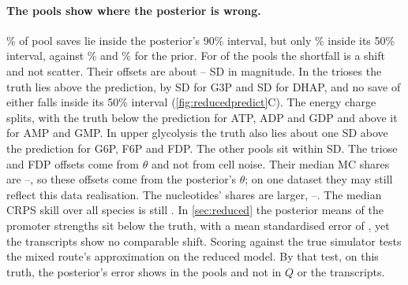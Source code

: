 \paragraph{The pools show where the posterior is wrong.} \% of pool saves
lie inside the posterior's 90\% interval, but only \% inside its 50\%
interval, against \% and \% for the prior. For
 of the  pools the shortfall is a shift and not scatter. Their offsets are
about -- SD in magnitude. In the trioses the truth lies above
the prediction, by  SD for G3P and  SD for DHAP, and no save of
either falls inside its 50\% interval (\cref{fig:reducedpredict}C). The energy charge splits,
with the truth below the prediction for ATP, ADP and GDP and above it for AMP and GMP. In upper
glycolysis the truth also lies about one SD above the prediction for G6P, F6P and FDP. The other 
pools sit within  SD. The triose and FDP offsets come from $\theta$ and not from cell
noise. Their median MC shares are --, so these offsets
come from the posterior's $\theta$; on one dataset they may still reflect this data realisation. The nucleotides' shares are larger, --. The median CRPS skill over
all species is still . In \cref{sec:reduced} the posterior means of the promoter
strengths sit below the truth, with a mean standardised error of , yet the
transcripts show no comparable shift. Scoring against the true simulator tests the mixed route's
approximation on the reduced model. By that test, on this truth, the posterior's error shows in the pools and
not in $Q$ or the transcripts.


